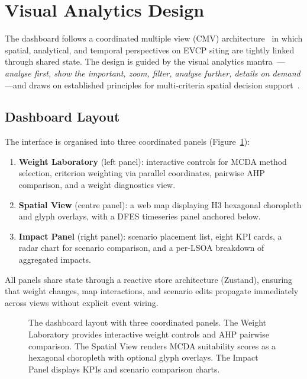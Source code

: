 
\section{Visual Analytics Design}
\label{sec:vis-design}

The dashboard follows a coordinated multiple view (CMV) architecture~\cite{roberts2007coordinated} in which spatial, analytical, and temporal perspectives on EVCP siting are tightly linked through shared state. The design is guided by the visual analytics mantra~\cite{keim2008visual}---\emph{analyse first, show the important, zoom, filter, analyse further, details on demand}---and draws on established principles for multi-criteria spatial decision support~\cite{andrienko2007geovisual,jankowski2001gis}.

\subsection{Dashboard Layout}
\label{sec:layout}

The interface is organised into three coordinated panels (Figure~\ref{fig:dashboard-layout}):

\begin{enumerate}[nosep]
    \item \textbf{Weight Laboratory} (left panel): interactive controls for MCDA method selection, criterion weighting via parallel coordinates, pairwise AHP comparison, and a weight diagnostics view.
    \item \textbf{Spatial View} (centre panel): a web map displaying H3 hexagonal choropleth and glyph overlays, with a DFES timeseries panel anchored below.
    \item \textbf{Impact Panel} (right panel): scenario placement list, eight KPI cards, a radar chart for scenario comparison, and a per-LSOA breakdown of aggregated impacts.
\end{enumerate}

\noindent All panels share state through a reactive store architecture (Zustand), ensuring that weight changes, map interactions, and scenario edits propagate immediately across views without explicit event wiring.

\begin{figure}[htbp]
    \centering
    \caption{The dashboard layout with three coordinated panels. The Weight Laboratory provides interactive weight controls and AHP pairwise comparison. The Spatial View renders MCDA suitability scores as a hexagonal choropleth with optional glyph overlays. The Impact Panel displays KPIs and scenario comparison charts.}
    \label{fig:dashboard-layout}
\end{figure}

